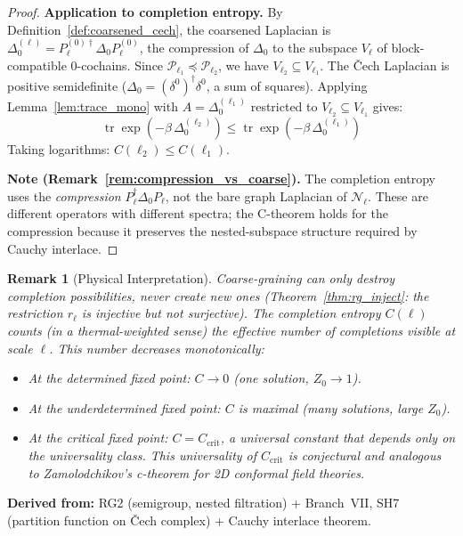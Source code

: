 \documentclass[11pt,letterpaper]{article}
\newtheorem{remark}[conjecture]{Remark}
\newcommand{\tr}{\operatorname{tr}}
\newcommand{\nerve}{\mathcal{N}}
\newcommand{\partition}{\mathcal{P}}
\begin{document}
\begin{proof}
\textbf{Application to completion entropy.} By 
Definition~\ref{def:coarsened_cech}, the coarsened Laplacian is 
$\Delta_0^{(\ell)} = P_\ell^{(0)\dagger} \Delta_0 P_\ell^{(0)}$, 
the compression of $\Delta_0$ to the subspace $V_\ell$ of 
block-compatible 0-cochains. Since $\partition_{\ell_1} 
\preccurlyeq \partition_{\ell_2}$, we have $V_{\ell_2} \subseteq 
V_{\ell_1}$. The \v{C}ech Laplacian is positive semidefinite 
($\Delta_0 = (\delta^0)^\dagger \delta^0$, a sum of squares). 
Applying Lemma~\ref{lem:trace_mono} with $A = \Delta_0^{(\ell_1)}$ 
restricted to $V_{\ell_2} \subseteq V_{\ell_1}$ gives:
\[
    \tr \exp(-\beta \, \Delta_0^{(\ell_2)}) 
    \leq \tr \exp(-\beta \, \Delta_0^{(\ell_1)})
\]
Taking logarithms: $C(\ell_2) \leq C(\ell_1)$.

\textbf{Note (Remark~\ref{rem:compression_vs_coarse}).} The 
completion entropy uses the \emph{compression} $P_\ell^\dagger 
\Delta_0 P_\ell$, not the bare graph Laplacian of $\nerve_\ell$. 
These are different operators with different spectra; the 
C-theorem holds for the compression because it preserves the 
nested-subspace structure required by Cauchy interlace.
\end{proof}

\begin{remark}[Physical Interpretation]\label{rem:c_physical}
Coarse-graining can only \emph{destroy} completion possibilities, 
never create new ones (Theorem~\ref{thm:rg_inject}: the restriction 
$r_\ell$ is injective but not surjective). The completion entropy 
$C(\ell)$ counts (in a thermal-weighted sense) the effective number 
of completions visible at scale $\ell$. This number decreases 
monotonically:

\begin{itemize}
    \item At the determined fixed point: $C \to 0$ (one solution, 
    $Z_0 \to 1$).
    \item At the underdetermined fixed point: $C$ is maximal (many 
    solutions, large $Z_0$).
    \item At the critical fixed point: $C = C_{\mathrm{crit}}$, a 
    \emph{universal constant} that depends only on the universality 
    class. This universality of $C_{\mathrm{crit}}$ is conjectural 
    and analogous to Zamolodchikov's c-theorem for 2D conformal 
    field theories.
\end{itemize}
\end{remark}

\textbf{Derived from:} RG2 (semigroup, nested filtration) + 
Branch~VII, SH7 (partition function on \v{C}ech complex) + Cauchy 
interlace theorem.
\end{document}
